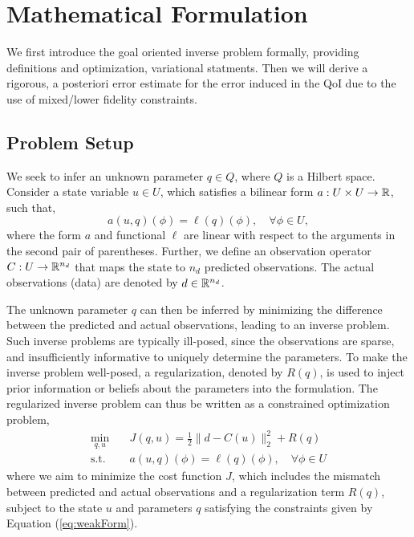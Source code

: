 \section{Mathematical Formulation}\label{sect:form}
%
We first introduce the goal oriented inverse problem formally, providing definitions and optimization, variational statments. Then we will derive a rigorous, a posteriori error estimate for the error induced in the QoI due to the use of mixed/lower fidelity constraints.

\subsection{Problem Setup}  \label{sec:setup}
%
We seek to infer an unknown parameter $q \in Q$, where $Q$ is a Hilbert space. Consider a state variable $u \in U$, which satisfies a bilinear form $a:U \times U \to {\mathbb{R}}$, such that,
%
\begin{equation}
\label{eq:weakForm}
a(u,q)(\phi)=\ell(q)(\phi),\quad\forall\phi\in U,
\end{equation}
%
where the form $a$ and functional $\ell$ are linear with respect to the arguments in the second pair of parentheses. Further, we define an observation operator $C:U\to{\mathbb{R}}^{n_d}$ that maps the state to $n_d$ predicted observations. The actual observations (data) are denoted by $d\in{\mathbb{R}}^{n_d}$. 

The unknown parameter $q$ can then be inferred by minimizing the difference between the predicted and actual observations, leading to an inverse problem. Such inverse problems are typically ill-posed, since the observations are sparse, and insufficiently informative to uniquely determine the parameters. To make the inverse problem well-posed, a regularization, denoted by $R(q)$, is used to inject prior information or beliefs about the parameters into the formulation. The regularized inverse problem can thus be written as a constrained optimization problem,
%
\begin{subequations}
\label{eq:invOpt}
\begin{align}
\min\limits_{q,u} & \quad J(q,u)=\frac{1}{2}\|d-C(u)\|_2^2 + R(q) \label{eq:invOpt_obj} \\
\textrm{s.t. }& \quad a(u,q)(\phi)=\ell(q)(\phi),\quad\forall\phi\in U \label{eq:invOpt_cons}
\end{align}
\end{subequations}
%
where we aim to minimize the cost function $J$, which includes the mismatch between predicted and actual observations and a regularization term $R(q)$, subject to the state $u$ and parameters $q$ satisfying the constraints given by Equation (\ref{eq:weakForm}). 

